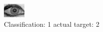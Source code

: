 \begin{figure}[h!]
\begin{center}
\includegraphics[width=0.60\columnwidth]{figures/ID1999_class_1_target_2.png}
\end{center}
\caption{ Classification: 1 actual target: 2}
\label{fig:ID1999_class_1_target_2}
\end{figure}

